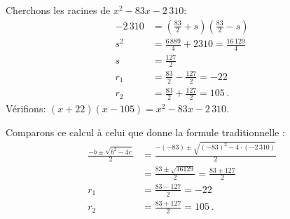 \begin{example}
Cherchons les racines de $x^2-83x-2\,310$:
\begin{align*}
-2\,310&=\left(\frac{83}{2}+s\right)\left(\frac{83}{2} -s\right)\\
s^2&=\frac{6\,889}{4}+2310=\frac{16\,129}{4}\\
s&=\frac{127}{2}\\
r_1&=\frac{83}{2}-\frac{127}{2}=-22\\
r_2&=\frac{83}{2}+\frac{127}{2}=105\,.
\end{align*}
Vérifions: $(x+22)(x-105)= x^2-83x-2\,310$.



Comparons ce calcul à celui que donne la formule traditionnelle :
\begin{align*}
\frac{-b\pm\sqrt{b^2-4c}}{2}&=\frac{-(-83)\pm\sqrt{(-83)^2-4\cdot (-2\,310)}}{2}\\
&= \frac{83\pm\sqrt{16129}}{2} = \frac{83\pm 127}{2}\\
r_1&=\frac{83-127}{2}=-22\\
r_2&=\frac{83+127}{2}=105\,.
\end{align*}
\end{example}

